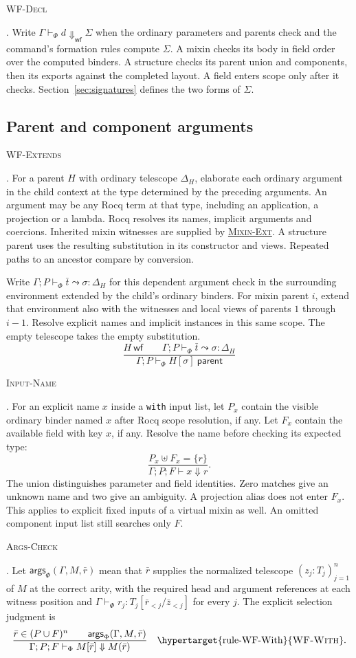\documentclass{article}
\newcommand{\ttt}[1]{\texttt{#1}}
\newcommand{\wf}{\mathsf{wf}}
\newcommand{\rdefn}[1]{\hypertarget{rule-#1}{\textsc{#1}}}
\newcommand{\ruse}[1]{\hyperlink{rule-#1}{\textsc{#1}}}
\begin{document}
\rdefn{WF-Decl}. Write $\Gamma\vdash_\Phi d\Downarrow_{\wf}\Sigma$
when the ordinary parameters and parents check and the command's
formation rules compute $\Sigma$. A mixin checks its body in field order
over the computed binders. A structure checks its parent union and
components, then its exports against the completed layout. A field enters
scope only after it checks. Section~\ref{sec:signatures} defines the two
forms of $\Sigma$.

\subsection{Parent and component arguments}

\rdefn{WF-Extends}. For a parent $H$ with ordinary telescope $\Delta_H$,
elaborate each ordinary argument in the child context at the type determined
by the preceding arguments. An argument may be any Rocq term at that type,
including an application, a projection or a lambda. Rocq resolves its names,
implicit arguments and coercions. Inherited mixin witnesses are supplied by
\ruse{Mixin-Ext}. A structure parent uses the resulting substitution in its
constructor and views. Repeated paths to an ancestor compare by conversion.

Write $\Gamma;P\vdash_\Phi \bar t\leadsto\sigma:\Delta_H$ for this
dependent argument check in the surrounding environment extended by the
child's ordinary binders. For mixin parent $i$, extend that environment
also with the witnesses and local views of parents $1$ through $i-1$.
Resolve explicit names and implicit instances in this same scope.
The empty telescope takes the empty substitution.
\[
 \frac{H\ \wf\qquad \Gamma;P\vdash_\Phi \bar t\leadsto\sigma:\Delta_H}
      {\Gamma;P\vdash_\Phi H[\sigma]\ \mathsf{parent}}
\]

\rdefn{Input-Name}. For an explicit name $x$ inside a \ttt{with} input
list, let $P_x$ contain the visible ordinary binder named $x$ after
Rocq scope resolution, if any. Let $F_x$ contain the available field
with key $x$, if any. Resolve the name before checking its expected type:
\[
  \frac{P_x\mathbin{\uplus} F_x=\{r\}}
       {\Gamma;P;F\vdash x\Downarrow r}.
\]
The union distinguishes parameter and field identities. Zero matches give
an unknown name and two give an ambiguity. A projection alias does not
enter $F_x$. This applies to explicit fixed inputs of a virtual mixin
as well. An omitted component input list still searches only $F$.

\rdefn{Args-Check}. Let $\mathsf{args}_\Phi(\Gamma,M,\bar r)$ mean that
$\bar r$ supplies the normalized telescope $(z_j:T_j)_{j=1}^n$ of $M$
at the correct arity, with the required head and argument references at
each witness position and
$\Gamma\vdash_\Phi r_j:T_j[\bar r_{<j}/\bar z_{<j}]$ for every $j$.
The explicit selection judgment is
\[
 \frac{\bar r\in(P\cup F)^n\qquad\mathsf{args}_\Phi(\Gamma,M,\bar r)}
      {\Gamma;P;F\vdash_\Phi M[\bar r]\Downarrow M(\bar r)}
 \quad\text{\rdefn{WF-With}} .
\]
\end{document}
